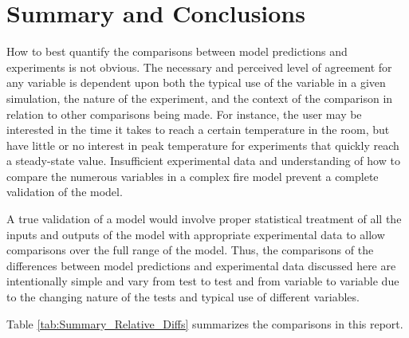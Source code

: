 	\chapter{Summary and Conclusions}

How to best quantify the comparisons between model predictions and experiments is not obvious. The necessary and perceived level of agreement for any variable is dependent upon both the typical use of the variable in a given simulation, the nature of the experiment, and the context of the comparison in relation to other comparisons being made. For instance, the user may be interested in the time it takes to reach a certain temperature in the room, but have little or no interest in peak temperature for experiments that quickly reach a steady-state value. Insufficient experimental data and understanding of how to compare the numerous variables in a complex fire model prevent a complete validation of the model. 

A true validation of a model would involve proper statistical treatment of all the inputs and outputs of the model with appropriate experimental data to allow comparisons over the full range of the model. Thus, the comparisons of the differences between model predictions and experimental data discussed here are intentionally simple and vary from test to test and from variable to variable due to the changing nature of the tests and typical use of different variables.

Table \ref{tab:Summary_Relative_Diffs} summarizes the comparisons in this report.

